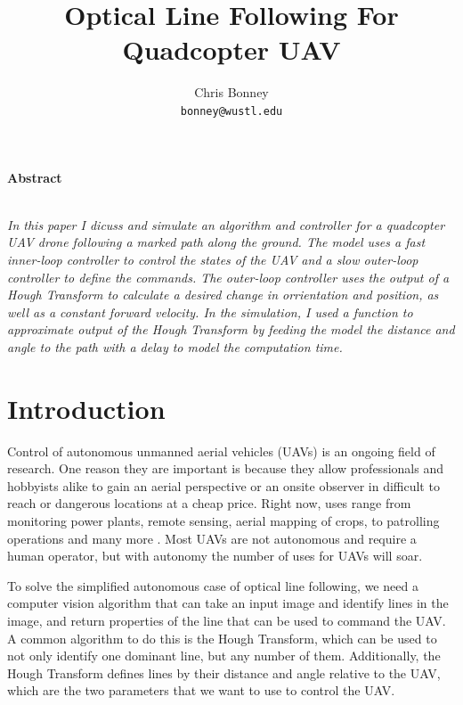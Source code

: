 \documentclass[10pt,twocolumn,letterpaper]{article}
\date{}
\title{Optical Line Following For Quadcopter UAV}
\author{%
Chris Bonney\\
{\tt bonney@wustl.edu}
}
\begin{document}
	\maketitle
	
	\begin{center}\textbf{Abstract}\\~\\\parbox{0.475\textwidth}{\em
			In this paper I dicuss and simulate an algorithm and controller for a quadcopter UAV drone following a marked path along the ground. The model uses a fast inner-loop controller to control the states of the UAV and a slow outer-loop controller to define the commands. The outer-loop controller uses the output of a Hough Transform to calculate a desired change in orrientation and position, as well as a constant forward velocity. In the simulation, I used a function to approximate output of the Hough Transform by feeding the model the distance and angle to the path with a delay to model the computation time. 
			
	}\end{center}

	\section{Introduction}
	
	Control of autonomous unmanned aerial vehicles (UAVs) is an ongoing field of research. One reason they are important is because they allow professionals and hobbyists alike to gain an aerial perspective or an onsite observer in difficult to reach or dangerous locations at a cheap price. Right now, uses range from monitoring power plants, remote sensing, aerial mapping of crops, to patrolling operations and many more \cite{ceppi}.  Most UAVs are not autonomous and require a human operator, but with autonomy the number of uses for UAVs will soar. 
	
	To solve the simplified autonomous case of optical line following, we need a computer vision algorithm that can take an input image and identify lines in the image, and return properties of the line that can be used to command the UAV. A common algorithm to do this is the Hough Transform, which can be used to not only identify one dominant line, but any number of them. Additionally, the Hough Transform defines lines by their distance and angle relative to the UAV, which are the two parameters that we want to use to control the UAV. 
	
\end{document}
